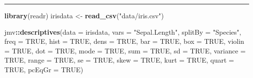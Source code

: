 \documentclass[]{article}
\newenvironment{Shaded}{\begin{snugshade}}{\end{snugshade}}
\newcommand{\DataTypeTok}[1]{\textcolor[rgb]{0.13,0.29,0.53}{#1}}
\newcommand{\KeywordTok}[1]{\textcolor[rgb]{0.13,0.29,0.53}{\textbf{#1}}}
\newcommand{\NormalTok}[1]{#1}
\newcommand{\OperatorTok}[1]{\textcolor[rgb]{0.81,0.36,0.00}{\textbf{#1}}}
\newcommand{\OtherTok}[1]{\textcolor[rgb]{0.56,0.35,0.01}{#1}}
\newcommand{\StringTok}[1]{\textcolor[rgb]{0.31,0.60,0.02}{#1}}
\begin{document}
\begin{center}\rule{0.5\linewidth}{\linethickness}\end{center}

\begin{Shaded}
\begin{Highlighting}[]
\KeywordTok{library}\NormalTok{(readr)}
\NormalTok{irisdata <-}\StringTok{ }\KeywordTok{read_csv}\NormalTok{(}\StringTok{"data/iris.csv"}\NormalTok{)}

\NormalTok{jmv}\OperatorTok{::}\KeywordTok{descriptives}\NormalTok{(}\DataTypeTok{data =}\NormalTok{ irisdata, }\DataTypeTok{vars =} \StringTok{"Sepal.Length"}\NormalTok{, }\DataTypeTok{splitBy =} \StringTok{"Species"}\NormalTok{, }
    \DataTypeTok{freq =} \OtherTok{TRUE}\NormalTok{, }\DataTypeTok{hist =} \OtherTok{TRUE}\NormalTok{, }\DataTypeTok{dens =} \OtherTok{TRUE}\NormalTok{, }\DataTypeTok{bar =} \OtherTok{TRUE}\NormalTok{, }\DataTypeTok{box =} \OtherTok{TRUE}\NormalTok{, }\DataTypeTok{violin =} \OtherTok{TRUE}\NormalTok{, }
    \DataTypeTok{dot =} \OtherTok{TRUE}\NormalTok{, }\DataTypeTok{mode =} \OtherTok{TRUE}\NormalTok{, }\DataTypeTok{sum =} \OtherTok{TRUE}\NormalTok{, }\DataTypeTok{sd =} \OtherTok{TRUE}\NormalTok{, }\DataTypeTok{variance =} \OtherTok{TRUE}\NormalTok{, }\DataTypeTok{range =} \OtherTok{TRUE}\NormalTok{, }
    \DataTypeTok{se =} \OtherTok{TRUE}\NormalTok{, }\DataTypeTok{skew =} \OtherTok{TRUE}\NormalTok{, }\DataTypeTok{kurt =} \OtherTok{TRUE}\NormalTok{, }\DataTypeTok{quart =} \OtherTok{TRUE}\NormalTok{, }\DataTypeTok{pcEqGr =} \OtherTok{TRUE}\NormalTok{)}
\end{Highlighting}
\end{Shaded}
\end{document}
